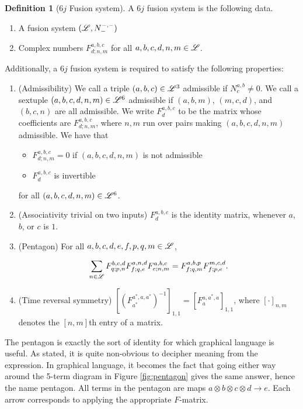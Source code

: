 \documentclass{article}
\theoremstyle{definition}
\newtheorem*{definition}{Definition}
\numberwithin{figure}{section}
\begin{document}
\begin{definition}[$6j$ Fusion system] A $6j$ fusion system is the following data.

\begin{enumerate}
\item A fusion system $(\mathscr{L}, N_{\--}^{\--,\--})$
\item Complex numbers $F^{a,b,c}_{d;n,m}$ for all $a,b,c,d,n,m\in \mathscr{L}$.
\end{enumerate} 

Additionally, a $6j$ fusion system is required to satisfy the following properties:

\begin{enumerate}

\item (Admissibility) We call a triple $(a,b,c)\in \mathscr{L}^3$ admissible if $N^{a,b}_c\neq 0$. We call a sextuple $(a,b,c,d,n,m)\in \mathscr{L}^6$ admissible if $(a,b,m)$, $(m,c,d)$, and $(b,c,n)$ are all admissible. We write $F^{a,b,c}_{d}$ to be the matrix whose coefficients are $F^{a,b,c}_{d;n,m}$, where $n,m$ run over pairs making $(a,b,c,d,n,m)$ admissible. We have that
\begin{itemize}
\item $F^{a,b,c}_{d;n,m}=0$ if $(a,b,c,d,n,m)$ is not admissible
\item $F^{a,b,c}_{d}$ is invertible
\end{itemize}

for all $(a,b,c,d,n,m)\in \mathscr{L}^6$.

\item (Associativity trivial on two inputs) $F^{a,b,c}_{d}$ is the identity matrix, whenever $a$, $b$, or $c$ is $1$.

\item (Pentagon) For all $a,b,c,d,e,f,p,q,m\in\mathscr{L}$,

$$\sum_{n\in \mathscr{L}}F^{b,c,d}_{q;p,n}F^{a,n,d}_{f;q,e}F^{a,b,c}_{e;n,m}=F^{a,b,p}_{f; q,m}F^{m,c,d}_{f;p,e}.$$

\item (Time reversal symmetry) $\left[\left(F^{a^*,a,a^*}_{a^*}\right)^{-1}\right]_{1,1}=\left[F^{a,a^*,a}_{a}\right]_{1,1}$, where $\left[\cdot\right]_{n,m}$ denotes the $[n,m]$th entry of a matrix.
\end{enumerate}
\raggedleft\qedsymbol{}
\end{definition}

The pentagon is exactly the sort of identity for which graphical language is useful. As stated, it is quite non-obvious to decipher meaning from the expression. In graphical language, it becomes the fact that going either way around the 5-term diagram in Figure \ref{fig:pentagon} gives the same answer, hence the name pentagon. All terms in the pentagon are maps $a \otimes b\otimes c\otimes d \to e$. Each arrow corresponds to applying the appropriate $F$-matrix.
\end{document}
